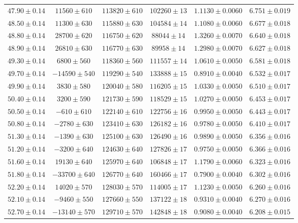 \documentclass[a4paper,11pt]{article}
\begin{document}
\begin{longtable}{c c c c c c}
$47.90 \pm 0.14$ & $11560 \pm 610$ & $113820 \pm 610$ & $102260 \pm 13$ & $1.1130 \pm 0.0060$ & $6.751 \pm 0.019$ \\
$48.50 \pm 0.14$ & $11300 \pm 630$ & $115880 \pm 630$ & $104584 \pm 14$ & $1.1080 \pm 0.0060$ & $6.677 \pm 0.018$ \\
$48.80 \pm 0.14$ & $28700 \pm 620$ & $116750 \pm 620$ & $88044 \pm 14$ & $1.3260 \pm 0.0070$ & $6.640 \pm 0.018$ \\
$48.90 \pm 0.14$ & $26810 \pm 630$ & $116770 \pm 630$ & $89958 \pm 14$ & $1.2980 \pm 0.0070$ & $6.627 \pm 0.018$ \\
$49.30 \pm 0.14$ & $6800 \pm 560$ & $118360 \pm 560$ & $111557 \pm 14$ & $1.0610 \pm 0.0050$ & $6.581 \pm 0.018$ \\
$49.70 \pm 0.14$ & $-14590 \pm 540$ & $119290 \pm 540$ & $133888 \pm 15$ & $0.8910 \pm 0.0040$ & $6.532 \pm 0.017$ \\
$49.90 \pm 0.14$ & $3830 \pm 580$ & $120040 \pm 580$ & $116205 \pm 15$ & $1.0330 \pm 0.0050$ & $6.510 \pm 0.017$ \\
$50.40 \pm 0.14$ & $3200 \pm 590$ & $121730 \pm 590$ & $118529 \pm 15$ & $1.0270 \pm 0.0050$ & $6.453 \pm 0.017$ \\
$50.50 \pm 0.14$ & $-610 \pm 610$ & $122140 \pm 610$ & $122756 \pm 16$ & $0.9950 \pm 0.0050$ & $6.443 \pm 0.017$ \\
$50.80 \pm 0.14$ & $-2780 \pm 630$ & $123410 \pm 630$ & $126182 \pm 16$ & $0.9780 \pm 0.0050$ & $6.410 \pm 0.017$ \\
$51.30 \pm 0.14$ & $-1390 \pm 630$ & $125100 \pm 630$ & $126490 \pm 16$ & $0.9890 \pm 0.0050$ & $6.356 \pm 0.016$ \\
$51.20 \pm 0.14$ & $-3200 \pm 640$ & $124630 \pm 640$ & $127826 \pm 17$ & $0.9750 \pm 0.0050$ & $6.366 \pm 0.016$ \\
$51.60 \pm 0.14$ & $19130 \pm 640$ & $125970 \pm 640$ & $106848 \pm 17$ & $1.1790 \pm 0.0060$ & $6.323 \pm 0.016$ \\
$51.80 \pm 0.14$ & $-33700 \pm 640$ & $126770 \pm 640$ & $160466 \pm 17$ & $0.7900 \pm 0.0040$ & $6.302 \pm 0.016$ \\
$52.20 \pm 0.14$ & $14020 \pm 570$ & $128030 \pm 570$ & $114005 \pm 17$ & $1.1230 \pm 0.0050$ & $6.260 \pm 0.016$ \\
$52.10 \pm 0.14$ & $-9460 \pm 550$ & $127660 \pm 550$ & $137122 \pm 18$ & $0.9310 \pm 0.0040$ & $6.270 \pm 0.016$ \\
$52.70 \pm 0.14$ & $-13140 \pm 570$ & $129710 \pm 570$ & $142848 \pm 18$ & $0.9080 \pm 0.0040$ & $6.208 \pm 0.015$ \\
\end{longtable}
\end{document}
